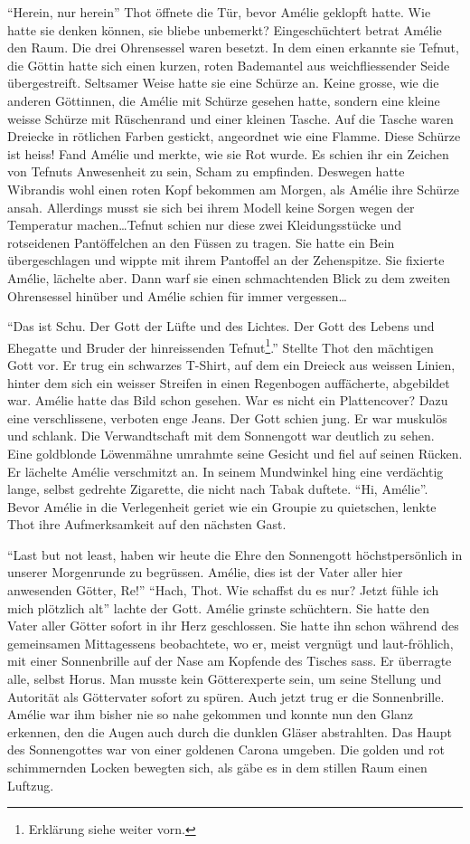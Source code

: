 \documentclass[11pt,titlepage,a5paper]{book}
\begin{document}
"`Herein, nur herein"' Thot öffnete die Tür, bevor Amélie geklopft hatte. Wie hatte sie denken können, sie bliebe unbemerkt? Eingeschüchtert betrat Amélie den Raum. Die drei Ohrensessel waren besetzt. In dem einen erkannte sie Tefnut, die Göttin hatte sich einen kurzen, roten Bademantel aus weichfliessender Seide übergestreift. Seltsamer Weise hatte sie eine Schürze an. Keine grosse, wie die anderen Göttinnen, die Amélie mit Schürze gesehen hatte, sondern eine kleine weisse Schürze mit Rüschenrand und einer kleinen Tasche. Auf die Tasche waren Dreiecke in rötlichen Farben gestickt, angeordnet wie eine Flamme. Diese Schürze ist heiss! Fand Amélie und merkte, wie sie Rot wurde. Es schien ihr ein Zeichen von Tefnuts Anwesenheit zu sein, Scham zu empfinden. Deswegen hatte Wibrandis wohl einen roten Kopf bekommen am Morgen, als Amélie ihre Schürze ansah. Allerdings musst sie sich bei ihrem Modell keine Sorgen wegen der Temperatur machen\dots Tefnut schien nur diese zwei Kleidungsstücke und rotseidenen Pantöffelchen an den Füssen zu tragen.  Sie hatte ein Bein übergeschlagen und wippte mit ihrem Pantoffel an der Zehenspitze. Sie fixierte Amélie, lächelte aber. Dann warf sie einen schmachtenden Blick zu dem zweiten Ohrensessel hinüber und Amélie schien für immer vergessen\dots

"`Das ist Schu. Der Gott der Lüfte und des Lichtes. Der Gott des Lebens und Ehegatte und Bruder der hinreissenden Tefnut\footnote{Erklärung siehe weiter vorn.}."' Stellte Thot den mächtigen  Gott vor. Er trug ein schwarzes T-Shirt, auf dem ein Dreieck aus weissen Linien, hinter dem sich ein weisser Streifen in einen Regenbogen auffächerte, abgebildet war. Amélie hatte das Bild schon gesehen. War es nicht ein Plattencover? Dazu eine verschlissene, verboten enge Jeans. Der Gott schien jung. Er war muskulös und schlank. Die Verwandtschaft mit dem Sonnengott war deutlich zu sehen. Eine goldblonde Löwenmähne umrahmte seine Gesicht und fiel auf seinen Rücken. Er lächelte Amélie verschmitzt an. In seinem Mundwinkel hing eine verdächtig lange, selbst gedrehte Zigarette, die nicht nach Tabak duftete. "`Hi, Amélie"'. Bevor Amélie in die Verlegenheit geriet wie ein Groupie zu quietschen, lenkte Thot ihre Aufmerksamkeit auf den nächsten Gast. 

"`Last but not least, haben wir heute die Ehre den Sonnengott höchstpersönlich in unserer Morgenrunde zu begrüssen. Amélie, dies ist der Vater aller hier anwesenden Götter, Re!"' "`Hach, Thot. Wie schaffst du es nur? Jetzt fühle ich mich plötzlich alt"' lachte der Gott. Amélie grinste schüchtern. Sie hatte den Vater aller Götter sofort in ihr Herz geschlossen. Sie hatte ihn schon während des gemeinsamen Mittagessens beobachtete, wo er, meist vergnügt und laut-fröhlich, mit einer Sonnenbrille auf der Nase am Kopfende des Tisches sass. Er überragte alle, selbst Horus. Man musste kein Götterexperte sein, um seine Stellung und Autorität als Göttervater sofort zu spüren. Auch jetzt trug er die Sonnenbrille. Amélie war ihm bisher nie so nahe gekommen und konnte nun den Glanz erkennen, den die Augen auch durch die dunklen Gläser abstrahlten. Das Haupt des Sonnengottes war von einer goldenen Carona umgeben. Die golden und rot schimmernden Locken bewegten sich, als gäbe es in dem stillen Raum einen Luftzug. 
\end{document}
